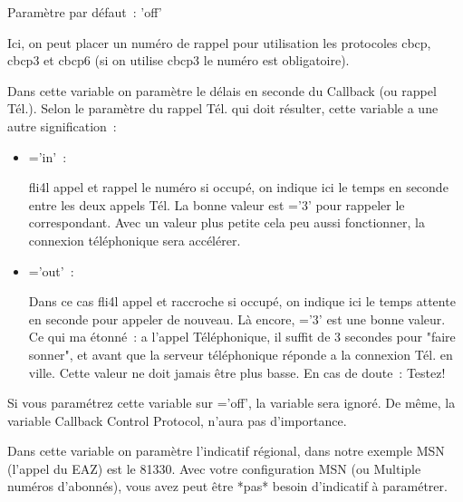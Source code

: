 \begin{description}
  Paramètre par défaut~: 'off'


  Ici, on peut placer un numéro de rappel pour utilisation les protocoles
  cbcp, cbcp3 et cbcp6 (si on utilise cbcp3 le numéro est obligatoire).


  Dans cette variable on paramètre le délais en seconde du Callback (ou rappel Tél.).
  Selon le paramètre du rappel Tél. qui doit résulter, cette variable a une
  autre signification~:

  \begin{itemize}
  \item  {}='in'~:

    fli4l appel et rappel le numéro si occupé, on indique ici
     le temps en seconde entre les deux
    appels Tél. La bonne valeur est \linebreak {}='3'
    pour rappeler le correspondant. Avec un valeur plus petite cela peu aussi
    fonctionner, la connexion téléphonique sera accélérer.

  \item {}='out'~:

    Dans ce cas fli4l appel et raccroche si occupé, on indique ici
     le temps attente en seconde pour appeler
    de nouveau. Là encore, ='3' est une bonne
    valeur. Ce qui ma étonné~: a l'appel Téléphonique, il suffit de 3 secondes
    pour "faire sonner", et avant que la serveur téléphonique réponde a la connexion
    Tél. en ville. Cette valeur ne doit jamais être plus basse. En cas de doute~: Testez!
  \end{itemize}

  Si vous paramétrez cette variable sur ='off',
  la variable \linebreak {} sera ignoré. De même,
  la variable Callback Control Protocol, n'aura pas d'importance.


  Dans cette variable on paramètre l'indicatif régional, dans notre exemple MSN
  (l'appel du EAZ) est le 81330. Avec votre configuration MSN (ou Multiple numéros
  d'abonnés), vous avez peut être *pas* besoin d'indicatif à paramétrer.


\end{description}

